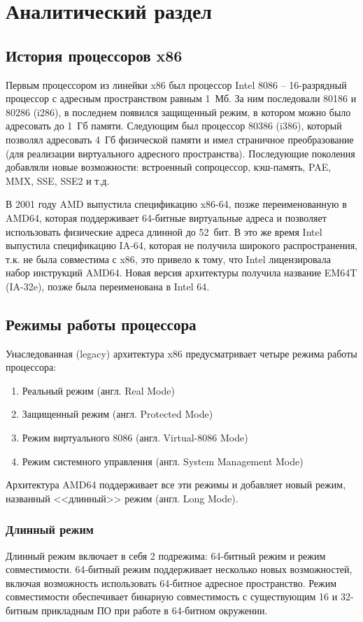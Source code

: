\chapter{Аналитический раздел}
\label{cha:analysis}

\section{История процессоров x86}
Первым процессором из линейки x86 был процессор Intel 8086 -- 16-разрядный процессор с адресным пространством
равным 1~Мб. За ним последовали 80186 и 80286 (i286), в последнем появился защищенный режим, в котором можно
было адресовать до 1~Гб памяти. Следующим был процессор 80386 (i386), который позволял адресовать 4~Гб физической
памяти и имел страничное преобразование (для реализации виртуального адресного пространства). Последующие
поколения добавляли новые возможности: встроенный сопроцессор, кэш-память, PAE, MMX, SSE, SSE2 и т.д.

В 2001 году AMD выпустила спецификацию x86-64, позже переименованную в AMD64, которая поддерживает 64-битные
виртуальные адреса и позволяет использовать физические адреса длинной до 52~бит. В это же время Intel выпустила
спецификацию IA-64, которая не получила широкого распространения, т.к. не была совместима с x86, это привело
к тому, что Intel лицензировала набор инструкций AMD64. Новая версия архитектуры получила название EM64T (IA-32e), позже была
переименована в Intel 64.

\section{Режимы работы процессора}
Унаследованная (legacy) архитектура x86 предусматривает четыре режима работы процессора:
\begin{enumerate}[1.]
	\item Реальный режим (англ. Real Mode)
	\item Защищенный режим (англ. Protected Mode)
	\item Режим виртуального 8086 (англ. Virtual-8086 Mode)
	\item Режим системного управления (англ. System Management Mode)
\end{enumerate}

Архитектура AMD64 поддерживает все эти режимы и добавляет новый режим,
названный <<длинный>> режим (англ. Long Mode).

\subsection{Длинный режим}
Длинный режим включает в себя 2 подрежима: 64-битный режим и режим совместимости.
64-битный режим поддерживает несколько новых возможностей, включая возможность
использовать 64-битное адресное пространство. Режим совместимости обеспечивает
бинарную совместимость с существующим 16 и 32-битным прикладным ПО при работе
в 64-битном окружении.

